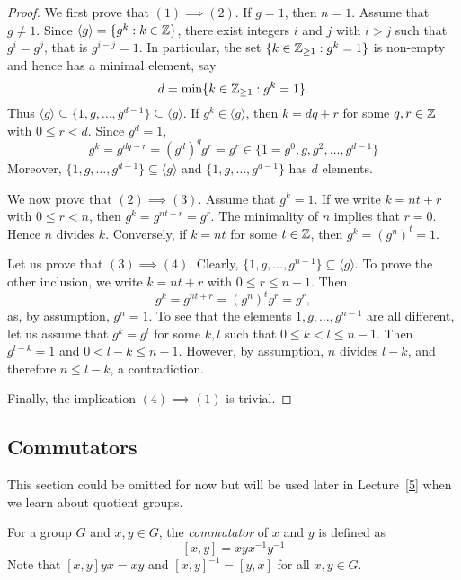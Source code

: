\begin{proof}
        We first prove that $(1)\implies(2)$.
        If $g=1$, then $n=1$. Assume that $g\ne1$. Since $\langle g\rangle=\{g^k:k\in\mathbb{Z}\}$,
        there exist integers $i$ and $j$ with $i>j$ such that $g^i=g^j$, that is $g^{i-j}=1$. In particular,
        the set $\{k\in\mathbb{Z}_{\geq1}:g^k=1\}$ is non-empty and hence has a minimal element, say 
        \[
        d=\min\{k\in\mathbb{Z}_{\geq1}:g^k=1\}.
        \]
        Thus $\langle g\rangle\subseteq\{1,g,\dots,g^{d-1}\}\subseteq\langle g\rangle$. 
        If $g^k\in\langle g\rangle$, then $k=dq+r$ for some $q,r\in\mathbb{Z}$ with $0\leq r<d$. Since $g^d=1$,
        \[
        g^k=g^{dq+r}=(g^d)^qg^r=g^r\in\{1=g^0,g,g^2,\dots,g^{d-1}\}
        \]
        Moreover, $\{1,g,\dots,g^{d-1}\}\subseteq \langle g\rangle$ and 
        $\{1,g,\dots,g^{d-1}\}$ has $d$ elements.

        We now prove that $(2)\implies(3)$. Assume that $g^k=1$. If 
        we write $k=nt+r$ with $0\leq r<n$, then $g^k=g^{nt+r}=g^r$. The minimality of $n$ 
        implies that $r=0$. Hence $n$ divides $k$.
        Conversely, if $k=nt$ for some $t\in\mathbb{Z}$, then $g^k=(g^n)^t=1$.

        Let us prove that $(3)\implies(4)$. Clearly, 
        $\{1,g,\dots,g^{n-1}\}\subseteq\langle g\rangle$. To prove the other 
        inclusion, we write $k=nt+r$ with $0\leq r\leq n-1$. Then 
        \[
                g^k=g^{nt+r}=(g^n)^tg^r=g^r, 
        \]
        as, by assumption, $g^n=1$. To see that the elements 
        $1,g,\dots,g^{n-1}$ are all different, let us assume that $g^k=g^l$ for some $k,l$ such that $0\leq
        k<l\leq n-1$. Then $g^{l-k}=1$ and $0<l-k\leq n-1$. However, by assumption, 
        $n$ divides $l-k$, and therefore
        $n\leq l-k$,
        a contradiction.

        Finally, the implication $(4)\implies(1)$ is trivial.
\end{proof}

\subsection{Commutators}

This section could be omitted for now but will be used later in Lecture~\ref{5} when we learn about quotient groups. 

For a group $G$ and $x,y\in G$, the \emph{commutator} 
of $x$ and $y$ is defined as 
\[
[x,y]=xyx^{-1}y^{-1}
\]
Note that $[x,y]yx=xy$ and 
$[x,y]^{-1}=[y,x]$ for all $x,y\in G$. 

